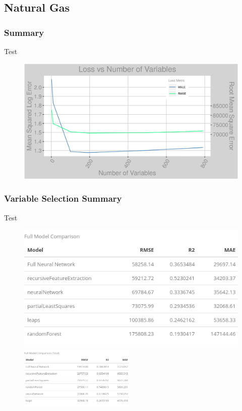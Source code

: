 \subsection{Natural Gas}
\subsubsection{Summary}
Test

\begin{figure}[h]
\centering
\includegraphics[width=\textwidth, height=0.25\textheight]{Images/natural_gas_psf_nn_error.png}
\end{figure}

\subsubsection{Variable Selection Summary}
Test

\begin{figure}[h]
\centering
\includegraphics[width=.49\textwidth, height=0.25\textheight]{Images/natural_gas_psf_model_summary.png}
\includegraphics[width=0.49\textwidth, height=0.25\textheight]{Images/natural_gas_psf_model_summary_transformed.png}
\end{figure}

